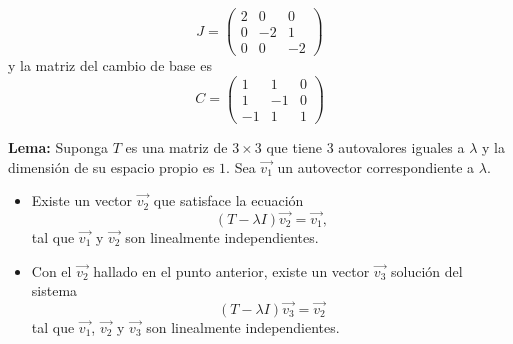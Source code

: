 \begin{example}
\bigskip

$$J=\left(\begin{array}{ccc} 2 & 0 & 0  \\ 0  & -2 & 1
\\ 0  & 0 & -2
\end{array}
 \right)$$ 
 \noindent
 y la matriz del cambio de base es 
$$C=\left(\begin{array}{ccc} 1 & 1 & 0  \\ 1  & -1 & 0
\\ -1  & 1 & 1
\end{array}
 \right)$$ 

\end{example} 
\bigskip

\bigskip

\textbf{Lema:}
Suponga  $T$ es una matriz de $3 \times 3$  que tiene $3$ autovalores iguales a $\lambda$ y la dimensión de su espacio propio es $1$. Sea  $\vec{v_1}$ un autovector correspondiente a $\lambda$.

\bigskip

\begin{itemize}
    \item 
    Existe un vector $\vec{v_2}$ que satisface la ecuación $$(T-\lambda I)\vec{v_2}=\vec{v_1},$$ tal que $\vec{v_1}$ y $\vec{v_2}$ son linealmente independientes.
    \item 
    
    \bigskip
    
    Con el  $\vec{v_2}$ hallado en el punto anterior, existe    un vector $\vec{v_3}$ solución del sistema  $$(T-\lambda I)\vec{v_3}=\vec{v_2}$$ tal que $\vec{v_1}$, $\vec{v_2}  $ y $\vec{v_3}$ son linealmente independientes.
\end{itemize}

\bigskip



